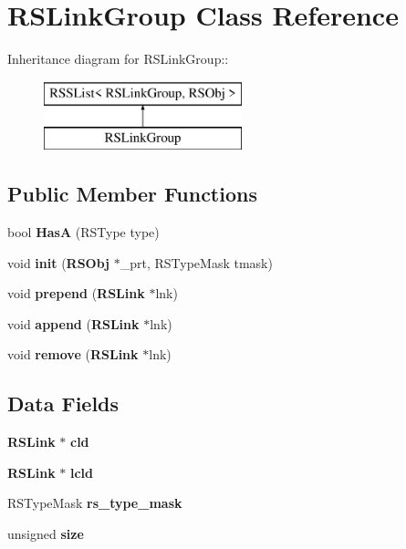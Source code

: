 \section{RSLinkGroup Class Reference}
\label{classRSLinkGroup}
Inheritance diagram for RSLinkGroup::\begin{figure}[H]
\begin{center}
\leavevmode
\includegraphics[height=2cm]{classRSLinkGroup}
\end{center}
\end{figure}
\subsection*{Public Member Functions}
\begin{DoxyCompactItemize}
\item 
bool {\bfseries HasA} (RSType type)\label{classRSLinkGroup_a09ff23048e50a78269a5afef1023c805}

\item 
void {\bfseries init} ({\bf RSObj} $\ast$\_\-prt, RSTypeMask tmask)\label{classRSLinkGroup_a3e8eeabe31cc2c627108ae6b063a0974}

\item 
void {\bfseries prepend} ({\bf RSLink} $\ast$lnk)\label{classRSLinkGroup_aa1d93e58ef28b1c8362d2ff7b1b646a0}

\item 
void {\bfseries append} ({\bf RSLink} $\ast$lnk)\label{classRSLinkGroup_ae288366c6b97a2e4324cddb78cdaaa0b}

\item 
void {\bfseries remove} ({\bf RSLink} $\ast$lnk)\label{classRSLinkGroup_a57fcbdedd72e75aa589e64063d2c764a}

\end{DoxyCompactItemize}
\subsection*{Data Fields}
\begin{DoxyCompactItemize}
\item 
{\bf RSLink} $\ast$ {\bfseries cld}\label{classRSLinkGroup_a2687c9fa2cbac82c52e3dfa30d7db47e}

\item 
{\bf RSLink} $\ast$ {\bfseries lcld}\label{classRSLinkGroup_a7ee22bc3581cc2dca827dd0138ea2afe}

\item 
RSTypeMask {\bfseries rs\_\-type\_\-mask}\label{classRSLinkGroup_af9c1848c92c27146984d97ea8a043f19}

\item 
unsigned {\bfseries size}\label{classRSLinkGroup_ad6d4ee713bb4544b5e582cde75fb14d5}

\end{DoxyCompactItemize}


